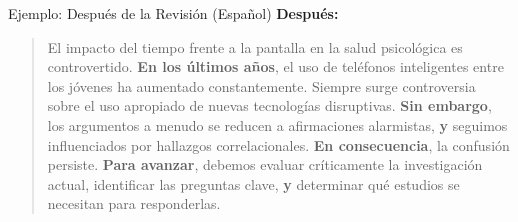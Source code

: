 \begin{frame}{Ejemplo: Después de la Revisión (Español)}
  \textbf{Después:}
  \begin{quote}
    El impacto del tiempo frente a la pantalla en la salud psicológica es
    controvertido.
    \textbf{En los últimos años}, el uso de teléfonos inteligentes entre los
    jóvenes ha aumentado constantemente.
    Siempre surge controversia sobre el uso apropiado de nuevas tecnologías
    disruptivas.
    \textbf{Sin embargo}, los argumentos a menudo se reducen a afirmaciones
    alarmistas, \textbf{y} seguimos influenciados por hallazgos correlacionales.
    \textbf{En consecuencia}, la confusión persiste.
    \textbf{Para avanzar}, debemos evaluar críticamente la investigación actual,
    identificar las preguntas clave, \textbf{y} determinar qué estudios se
    necesitan para responderlas.
  \end{quote}
\end{frame}
